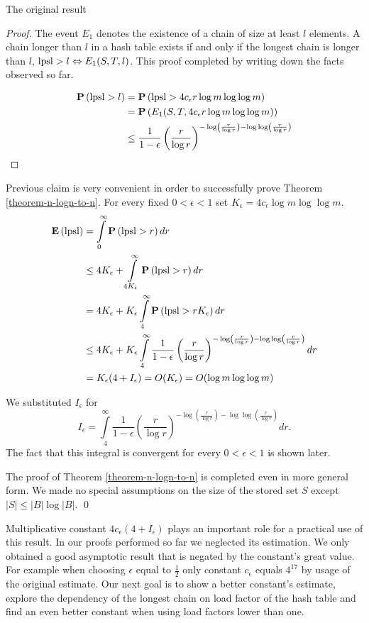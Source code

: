 \begin{section}{The original result}
\begin{proof}
The event $E_1$ denotes the existence of a chain of size at least $l$ elements. A chain longer than $l$ in a hash table exists if and only if the longest chain is longer than $l$, $\mathrm{lpsl} > l \Leftrightarrow E_1(S, T, l)$. This proof completed by writing down the facts observed so far.

\[
\begin{split}
\mathbf{P}\left(\mathrm{lpsl} > l\right) 
	& = \mathbf{P}\left(\mathrm{lpsl} > 4c_{\epsilon} r \log m \log \log m\right) \\
	& = \mathbf{P}\left(E_1(S, T, 4c_{\epsilon} r \log m \log \log m)\right) \\
	& \leq \frac{1}{1 - \epsilon} \left(\frac{r}{\log r}\right)^{-\log \left(\frac{r}{\log r}\right) - \log \log \left(\frac{r}{\log r}\right)} \\
\end{split}
\]
\end{proof}

Previous claim is very convenient in order to successfully prove Theorem \ref{theorem-n-logn-to-n}. For every fixed $0 < \epsilon < 1$ set $K_\epsilon = 4 c_\epsilon \log m \log \log m$.
\[
\begin{split}
\mathbf{E}\left(\mathrm{lpsl}\right)
	& = \int\limits_0^{\infty} \mathbf{P}\left(\mathrm{lpsl} > r\right) dr \\
	& \leq 4K_\epsilon + \int\limits_{4K_\epsilon}^\infty \mathbf{P}\left(\mathrm{lpsl} > r\right) dr \\
	& = 4K_\epsilon + K_\epsilon \int\limits_4^\infty \mathbf{P}\left(\mathrm{lpsl} > rK_\epsilon\right) dr \\
	& \leq 4K_\epsilon + K_\epsilon \int\limits_4^\infty \frac{1}{1 - \epsilon} \left(\frac{r}{\log r}\right)^{-\log \left(\frac{r}{\log r}\right) - \log \log \left(\frac{r}{\log r}\right)} dr \\
	& = K_\epsilon(4 + I_\epsilon) = O(K_\epsilon) = O(\log m \log \log m)
\end{split}
\]

We substituted $I_\epsilon$ for
\[
I_\epsilon = \int\limits_4^\infty \frac{1}{1 - \epsilon} \left(\frac{r}{\log r}\right)^{-\log \left(\frac{r}{\log r}\right) - \log \log \left(\frac{r}{\log r}\right)} dr \text{.}
\]
The fact that this integral is convergent for every $0 < \epsilon < 1$ is shown later.

The proof of Theorem \ref{theorem-n-logn-to-n} is completed even in more general form. We made no special assumptions on the size of the stored set $S$ except $|S| \leq |B| \log |B|$. \qed

\mbox{\qedhere}

Multiplicative constant $4 c_\epsilon(4 + I_\epsilon)$ plays an important role for a practical use of this result. In our proofs performed so far we neglected its estimation. We only obtained a good asymptotic result that is negated by the constant's great value. For example when choosing $\epsilon$ equal to $\frac{1}{2}$ only constant $c_\epsilon$ equals $4 ^ {17}$ by usage of the original estimate. Our next goal is to show a better constant's estimate, explore the dependency of the longest chain on load factor of the hash table and find an even better constant when using load factors lower than one.
\end{section}

